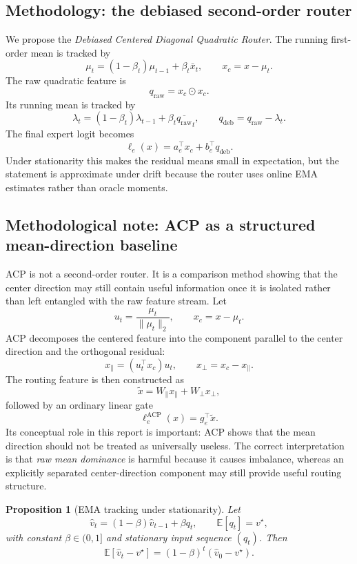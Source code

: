 \documentclass[11pt]{article}
\newtheorem{proposition}{Proposition}
\begin{document}
\subsection{Methodology: the debiased second-order router}
We propose the \emph{Debiased Centered Diagonal Quadratic Router}. The running first-order mean is tracked by
\[
\mu_t = (1-\beta_t)\mu_{t-1} + \beta_t \bar{x}_t,
\qquad
x_c = x-\mu_t.
\]
The raw quadratic feature is
\[
q_{\mathrm{raw}} = x_c \odot x_c.
\]
Its running mean is tracked by
\[
\lambda_t = (1-\beta_t)\lambda_{t-1} + \beta_t \overline{q_{\mathrm{raw}}}_t,
\qquad
q_{\mathrm{deb}} = q_{\mathrm{raw}}-\lambda_t.
\]
The final expert logit becomes
\[
\ell_e(x)=a_e^\top x_c + b_e^\top q_{\mathrm{deb}}.
\]
Under stationarity this makes the residual means small in expectation, but the statement is approximate under drift because the router uses online EMA estimates rather than oracle moments.

\subsection{Methodological note: ACP as a structured mean-direction baseline}
ACP is not a second-order router. It is a comparison method showing that the center direction may still contain useful information once it is isolated rather than left entangled with the raw feature stream. Let
\[
u_t=\frac{\mu_t}{\|\mu_t\|_2},
\qquad
x_c=x-\mu_t.
\]
ACP decomposes the centered feature into the component parallel to the center direction and the orthogonal residual:
\[
x_{\parallel}=(u_t^\top x_c)u_t,
\qquad
x_{\perp}=x_c-x_{\parallel}.
\]
The routing feature is then constructed as
\[
\tilde x = W_{\parallel}x_{\parallel}+W_{\perp}x_{\perp},
\]
followed by an ordinary linear gate
\[
\ell_e^{\mathrm{ACP}}(x)=g_e^\top \tilde x.
\]
Its conceptual role in this report is important: ACP shows that the mean direction should not be treated as universally useless. The correct interpretation is that \emph{raw mean dominance} is harmful because it causes imbalance, whereas an explicitly separated center-direction component may still provide useful routing structure.

\begin{proposition}[EMA tracking under stationarity]
Let
\[
\hat v_t=(1-\beta)\hat v_{t-1}+\beta q_t,
\qquad
\mathbb E[q_t]=v^\star,
\]
with constant $\beta\in(0,1]$ and stationary input sequence $(q_t)$. Then
\[
\mathbb E[\hat v_t-v^\star]=(1-\beta)^t(\hat v_0-v^\star).
\]
\end{proposition}
\end{document}
